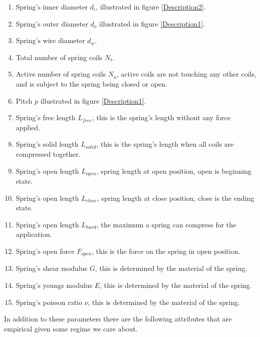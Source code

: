 \documentclass[10pt]{article}
\begin{document}
		\begin{enumerate}
			\item Spring's inner diameter $d_{i}$, illustrated in figure \ref{Description2}.
			\item Spring's outer diameter $d_{o}$ illustrated in figure \ref{Description1}.
			\item Spring's wire diameter $d_{w}$.
			\item Total number of spring coils $N_{t}$.
			\item Active number of spring coils $N_{a}$, active coils are not touching any other coils, and is subject to the spring being closed or open. 
			\item Pitch $p$ illustrated in figure \ref{Description1}.
			\item Spring's free length $L_{free}$, this is the spring's length without any force applied. 
			
			\item Spring's solid length $L_{solid}$, this is the spring's length when all coils are compressed together.
			\item Spring's open length $L_{open}$, spring length at open position, open is beginning state.
			\item Spring's open length $L_{close}$, spring length at close position, close is the ending state.
			\item Spring's open length $L_{hard}$, the maximum a spring can compress for the application.
			\item Spring's open force $F_{open}$, this is the force on the spring in open position.
			
			
			\item Spring's shear modulus $G$, this is determined by the material of the spring.
			\item Spring's youngs modulus $E$, this is determined by the material of the spring.
			\item Spring's poisson ratio $\nu$, this is determined by the material of the spring.
		
		\end{enumerate}
		
		In addition to these parameters there are the following attributes that are empirical given some regime we care about.
		
\end{document}
